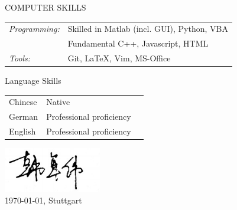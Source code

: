 \documentclass{resume} %
\begin{document}
\begin{rSection}{COMPUTER SKILLS}
\begin{tabular}{l l}
{\sl Programming:} &Skilled in Matlab (incl. GUI), Python, VBA \\&Fundamental C++, Javascript, HTML \\
{\sl Tools:} & Git, \LaTeX{}, Vim, MS-Office
\end{tabular}

\end{rSection}

\begin{rSection}{Language Skills}
\begin{tabular}{l l l}
Chinese & Native  \\
German  & Professional proficiency \\
English & Professional proficiency
\end{tabular}
\end{rSection}





% 
% 
\vspace{1cm}
\includegraphics[scale=0.7]{./moderncv/signature.png}\\
\today, Stuttgart
\end{document}
